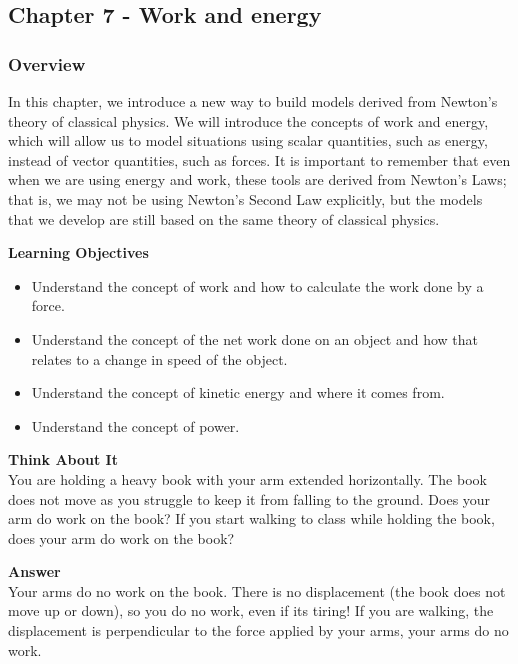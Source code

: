 \subsection{Chapter 7 - Work and energy}

\subsubsection{Overview}\label{chap:workenergy}

In this chapter, we introduce a new way to build models derived from Newton's theory of classical physics. We will introduce the concepts of work and energy, which will allow us to model situations using scalar quantities, such as energy, instead of vector quantities, such as forces. It is important to remember that even when we are using energy and work, these tools are derived from Newton's Laws; that is, we may not be using Newton's Second Law explicitly, but the models that we develop are still based on the same theory of classical physics.

\begin{framed}
\textbf{Learning Objectives}\\
\begin{itemize}
\item Understand the concept of work and how to calculate the work done by a force.
\item Understand the concept of the net work done on an object and how that relates to a change in speed of the object.
\item Understand the concept of kinetic energy and where it comes from.
\item Understand the concept of power.
\end{itemize}
\end{framed}

\begin{framed}
\textbf{Think About It}\\
You are holding a heavy book with your arm extended horizontally. The book does not move as you struggle to keep it from falling to the ground. Does your arm do work on the book? If you start walking to class while holding the book, does your arm do work on the book?

\begin{framed}
\textbf{Answer}\\
Your arms do no work on the book. There is no displacement (the book does not move up or down), so you do no work, even if its tiring! If you are walking, the displacement is perpendicular to the force applied by your arms, your arms do no work.
\end{framed}
\end{framed}

